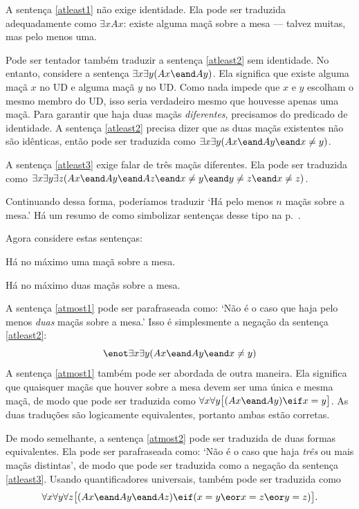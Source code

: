 A sentença \ref{atleast1} não exige identidade. Ela pode ser traduzida adequadamente como $\exists x Ax$: existe alguma maçã sobre a mesa — talvez muitas, mas pelo menos uma.

Pode ser tentador também traduzir a sentença \ref{atleast2} sem identidade. No entanto, considere a sentença $\exists x \exists y(Ax \eand Ay)$. Ela significa que existe alguma maçã $x$ no UD e alguma maçã $y$ no UD. Como nada impede que $x$ e $y$ escolham o mesmo membro do UD, isso seria verdadeiro mesmo que houvesse apenas uma maçã. Para garantir que haja duas maçãs \emph{diferentes}, precisamos do predicado de identidade. A sentença \ref{atleast2} precisa dizer que as duas maçãs existentes não são idênticas, então pode ser traduzida como $\exists x \exists y(Ax \eand Ay \eand x\neq y)$.

A sentença \ref{atleast3} exige falar de três maçãs diferentes. Ela pode ser traduzida como $\exists x \exists y\exists z(Ax \eand Ay \eand Az \eand x\neq y \eand y\neq z \eand x \neq z)$.

Continuando dessa forma, poderíamos traduzir `Há pelo menos $n$ maçãs sobre a mesa.' Há um resumo de como simbolizar sentenças desse tipo na p.~\pageref{summary.atleast}.


Agora considere estas sentenças:
\begin{earg}
\item[\ex{atmost1}] Há no máximo uma maçã sobre a mesa.
\item[\ex{atmost2}] Há no máximo duas maçãs sobre a mesa.
\end{earg}

A sentença \ref{atmost1} pode ser parafraseada como: `Não é o caso que haja pelo menos \emph{duas} maçãs sobre a mesa.' Isso é simplesmente a negação da sentença \ref{atleast2}:
$$\enot \exists x \exists y(Ax \eand Ay \eand x\neq y)$$
A sentença \ref{atmost1} também pode ser abordada de outra maneira. Ela significa que quaisquer maçãs que houver sobre a mesa devem ser uma única e mesma maçã, de modo que pode ser traduzida como $\forall x\forall y\bigl[(Ax \eand Ay) \eif x=y\bigr]$. As duas traduções são logicamente equivalentes, portanto ambas estão corretas.

De modo semelhante, a sentença \ref{atmost2} pode ser traduzida de duas formas equivalentes. Ela pode ser parafraseada como: `Não é o caso que haja \emph{três} ou mais maçãs distintas', de modo que pode ser traduzida como a negação da sentença \ref{atleast3}. Usando quantificadores universais, também pode ser traduzida como
$$\forall x\forall y\forall z\bigl[(Ax \eand Ay \eand Az) \eif (x=y \eor x=z \eor y=z)\bigr].$$

